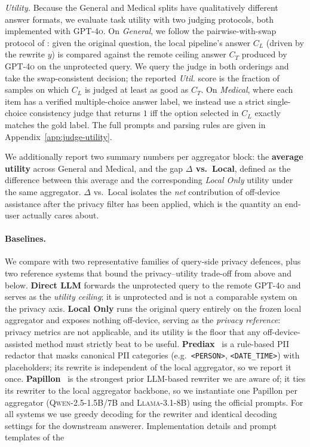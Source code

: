 \textit{Utility.} Because the General and Medical splits have
qualitatively different answer formats, we evaluate task utility with
two judging protocols, both implemented with \textsc{GPT-4o}. On
\emph{General}, we follow the pairwise-with-swap protocol of
\citet{papillon}: given the original question, the local pipeline's
answer $C_L$ (driven by the rewrite $y$) is compared against the
remote ceiling answer $C_T$ produced by \textsc{GPT-4o} on the
unprotected query. We query the judge in both orderings and take the
swap-consistent decision; the reported \textit{Util.} score is the
fraction of samples on which $C_L$ is judged at least as good as
$C_T$. On \emph{Medical}, where each item has a verified
multiple-choice answer label, we instead use a strict single-choice
consistency judge that returns $1$ iff the option selected in $C_L$
exactly matches the gold label. The full prompts and parsing rules
are given in Appendix~\ref{app:judge-utility}.

We additionally report two summary numbers per aggregator block:
the \textbf{average utility} across General and Medical, and the
gap \textbf{$\Delta$ vs.\ Local}, defined as the difference between
this average and the corresponding \textit{Local Only} utility under
the same aggregator. $\Delta$ vs.\ Local isolates the \emph{net}
contribution of off-device assistance after the privacy filter has
been applied, which is the quantity an end-user actually cares about.

\paragraph{Baselines.}
We compare with two representative families of query-side privacy
defences, plus two reference systems that bound the
privacy--utility trade-off from above and below.
\textbf{Direct LLM} forwards the unprotected query to the remote
\textsc{GPT-4o} and serves as the \emph{utility ceiling}; it is
unprotected and is not a comparable system on the privacy axis.
\textbf{Local Only} runs the original query entirely on the frozen
local aggregator and exposes nothing off-device, serving as the
\emph{privacy reference}: privacy metrics are not applicable, and its
utility is the floor that any off-device-assisted method must
strictly beat to be useful. \textbf{Prediax}~\citep{prediax} is a
rule-based PII redactor that masks canonical PII categories
(e.g.\ \texttt{<PERSON>}, \texttt{<DATE\_TIME>}) with placeholders;
its rewrite is independent of the local aggregator, so we report it
once. \textbf{Papillon}~\citep{papillon} is the strongest prior
LLM-based rewriter we are aware of; it ties its rewriter to the local
aggregator backbone, so we instantiate one Papillon per aggregator
(\textsc{Qwen-2.5-1.5B/7B} and \textsc{Llama-3.1-8B}) using the
official prompts. For all systems we use greedy decoding for the
rewriter and identical decoding settings for the downstream
answerer. Implementation details and prompt templates of the

